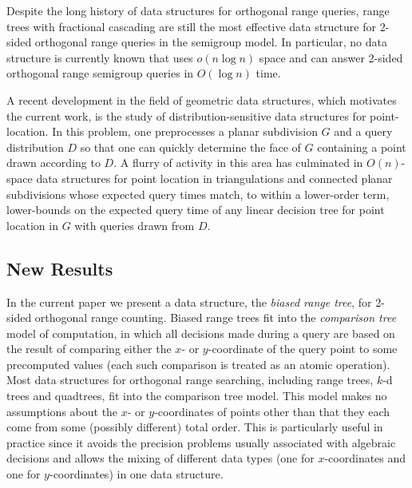 \documentclass{patmorin}
\begin{document}

Despite the long history of data structures for orthogonal range
queries, range trees with fractional cascading are still the most
effective data structure for 2-sided orthogonal range queries in the
semigroup model.  In particular, no data structure is currently known
that uses $o(n\log n)$ space and can answer 2-sided orthogonal range
semigroup queries in $O(\log n)$ time.

A recent development in the field of geometric data structures, which
motivates the current work, is the study of distribution-sensitive
data structures for point-location.  In this problem, one
preprocesses a planar subdivision $G$ and a query distribution $D$
so that one can quickly determine the face of $G$ containing a
point drawn according to $D$.  A flurry of activity in this area
\cite{acmr00,amm00,amm01a,amm01b,ammw07,cdilm08,cdilm09,i01,i04}
has culminated in $O(n)$-space data structures for point location
in triangulations \cite{ammw07} and connected planar subdivisions
\cite{cdilm09} whose expected query times match, to within a lower-order
term, lower-bounds on the expected query time of any linear decision
tree for point location in $G$ with queries drawn from $D$.

\subsection{New Results}

In the current paper we present a data structure, the \emph{biased range
tree}, for 2-sided orthogonal range counting.  Biased range trees fit into
the \emph{comparison tree} model of computation, in which all decisions
made during a query are based on the result of comparing either the
$x$- or $y$-coordinate of the query point to some precomputed values
(each such comparison is treated as an atomic operation).  Most data
structures for orthogonal range searching, including range trees, $k$-d
trees and quadtrees, fit into the comparison tree model. This model
makes no assumptions about the $x$- or $y$-coordinates of points other
than that they each come from some (possibly different) total order.
This is particularly useful in practice since it avoids the precision
problems usually associated with algebraic decisions and allows the
mixing of different data types (one for $x$-coordinates and one for
$y$-coordinates) in one data structure.
\end{document}
